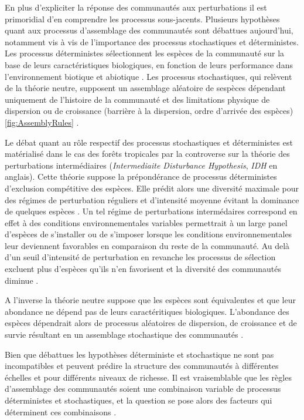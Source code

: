 \documentclass[
  11pt,
  french,
  A4paper,
  extrafontsizes,onecolumn,openright
  ]{memoir}
\begin{document}
En plus d'expliciter la réponse des communautés aux perturbations il est
primoridial d'en comprendre les processus sous-jacents. Plusieurs
hypothèses quant aux processus d'assemblage des communautés sont
débattues aujourd'hui, notamment vis à vis de l'importance des processus
stochastiques et déterministes. Les processus déterministes
sélectionnent les espèces de la communauté sur la base de leurs
caractéristiques biologiques, en fonction de leurs performance dans
l'environnement biotique et abiotique \autocite{Molino2001}. Les
processus stochastiques, qui relèvent de la théorie neutre, supposent un
assemblage aléatoire de sespèces dépendant uniquement de l'histoire de
la communauté et des limitations physique de dispersion ou de croissance
(barrière à la dispersion, ordre d'arrivée des espèces)
\ref{fig:AssemblyRules} \autocite{Hubbell2001}.

Le débat quant au rôle respectif des processus stochastiques et
déterministes est matérialisé dans le cas des forêts tropicales par la
controverse sur la théorie des perturbations intermédiaires
(\emph{Intermediaite Disturbance Hypothesis}, \emph{IDH} en anglais).
Cette théorie suppose la prépondérance de processus déterministes
d'exclusion compétitive des espèces. Elle prédit alors une diversité
maximale pour des régimes de perturbation réguliers et d'intensité
moyenne évitant la dominance de quelques espèces \autocite{Molino2001}.
Un tel régime de perturbations intermédaires correspond en effet à des
conditions environnementales variables permettrait à un large panel
d'espèces de s'installer ou de s'imposer lorsque les conditions
environnementales leur deviennent favorables en comparaison du reste de
la communauté. Au delà d'un seuil d'intensité de perturbation en
revanche les processus de sélection excluent plus d'espèces qu'ils n'en
favorisent et la diversité des communautés diminue
\autocites{Chesson2000}{Kariuki2006a}{Berry2008a}.

A l'inverse la théorie neutre suppose que les espèces sont équivalentes
et que leur abondance ne dépend pas de leurs caractéritiques
biologiques. L'abondance des espèces dépendrait alors de processus
aléatoires de dispersion, de croissance et de survie résultant en un
assemblage stochastique des communautés \autocite{Hubbell2001}.

Bien que débattues les hypothèses déterministe et stochastique ne sont
pas incompatibles et peuvent prédire la structure des communautés à
différentes échelles et pour différents niveaux de richesse. Il est
vraisemblable que les règles d'assemblage des communautés soient une
combinaison variable de processus déterministes et stochastiques, et la
question se pose alors des facteurs qui déterminent ces combinaisons
\autocite{Chave2004}.
\end{document}
